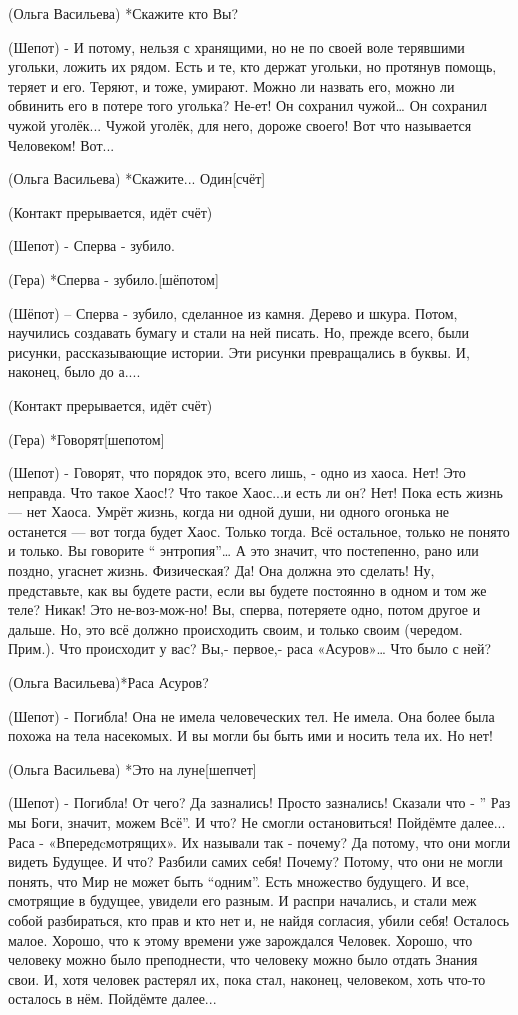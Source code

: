 (Ольга Васильева) *Скажите кто Вы?

(Шепот) - И потому, нельзя с хранящими, но не по своей воле терявшими угольки, ложить их рядом. Есть и те, кто держат угольки, но протянув помощь, теряет и его. Теряют, и тоже, умирают. Можно ли назвать его, можно ли обвинить его в потере того уголька? Не-ет! Он сохранил чужой… Он сохранил чужой уголёк... Чужой уголёк, для него, дороже своего! Вот что называется Человеком! Вот... 

(Ольга Васильева) *Скажите... Один[счёт]

(Контакт прерывается, идёт счёт)

(Шепот) - Сперва - зубило.

(Гера) *Сперва - зубило.[шёпотом]

(Шёпот) – Сперва - зубило, сделанное из камня. Дерево и шкура. Потом, научились создавать бумагу и стали на ней писать. Но, прежде всего,  были рисунки, рассказывающие истории. Эти рисунки превращались в буквы. И, наконец, было до а....


(Контакт прерывается, идёт счёт)


(Гера) *Говорят[шепотом]

(Шепот)  - Говорят, что порядок это, всего лишь, -  одно из хаоса. Нет! Это неправда. Что такое Хаос!? Что такое Хаос...и есть ли он? Нет! Пока есть жизнь — нет Хаоса. Умрёт жизнь, когда ни одной души, ни одного огонька не останется — вот тогда будет Хаос. Только тогда. Всё остальное, только не понято и только.  Вы говорите “ энтропия”… А это значит, что постепенно, рано или поздно, угаснет жизнь. Физическая? Да! Она должна это сделать! Ну, представьте, как вы будете расти, если вы будете постоянно в одном и том же теле? Никак! Это не-воз-мож-но! Вы, сперва, потеряете одно, потом другое и дальше. Но, это всё должно происходить своим, и только своим (чередом. Прим.). Что происходит у вас? Вы,- первое,- раса «Асуров»… Что было с ней?

(Ольга Васильева)*Раса Асуров?

(Шепот) - Погибла! Она не имела человеческих тел. Не имела. Она более была похожа на тела насекомых. И вы могли бы быть ими и носить тела их. Но нет! 

(Ольга Васильева) *Это на луне[шепчет]

(Шепот) - Погибла! От чего? Да зазнались! Просто  зазнались! Сказали что - ” Раз мы Боги, значит, можем Всё”. И что? Не смогли остановиться! Пойдёмте далее... Раса - «Впередcмотрящих». Их называли так  - почему? Да потому, что они могли видеть Будущее. И что? Разбили самих себя! Почему? Потому, что они не могли понять, что Мир не может быть “одним”. Есть множество будущего. И все, смотрящие в будущее, увидели его разным. И распри начались, и стали меж собой разбираться, кто прав и кто нет и, не найдя согласия, убили себя! Осталось малое. Хорошо, что к этому времени уже зарождался Человек. Хорошо, что человеку можно было преподнести, что человеку можно было отдать Знания свои. И, хотя человек растерял их, пока стал, наконец, человеком, хоть что-то  осталось в нём. Пойдёмте далее...

